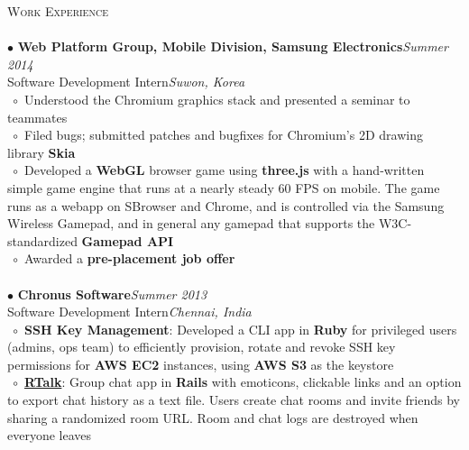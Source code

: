 \documentclass[a4paper,9pt]{article}
\begin{document}
\textcolor{myrust}{\large{\textsc{Work Experience}}}\textcolor{mygray}{\sout{\hfill}}\\\\
\normalsize
$\bullet$ \textbf{Web Platform Group, Mobile Division, Samsung Electronics}\hfill \textit{Summer 2014}\\
\textcolor{mydarkgray}{Software Development Intern}\hfill\textit{Suwon, Korea}\\
$\;\circ$ Understood the Chromium graphics stack and presented a seminar to teammates\\
$\;\circ$ Filed bugs; submitted patches and bugfixes for Chromium's 2D drawing library \textbf{Skia}\\
$\;\circ$ Developed a \textbf{WebGL} browser game using \textbf{three.js} with a hand-written simple game engine that runs at a nearly steady 60 FPS on mobile. The game runs as a webapp on SBrowser and Chrome, and is controlled via the Samsung Wireless Gamepad, and in general any gamepad that supports the W3C-standardized \textbf{Gamepad API}\\
$\;\circ$ Awarded a \textbf{pre-placement job offer}\\\\
$\bullet$ \textbf{Chronus Software}\hfill \textit{Summer 2013}\\
\textcolor{mydarkgray}{Software Development Intern}\hfill\textit{Chennai, India}\\
$\;\circ$ \textbf{SSH Key Management}: Developed a CLI app in \textbf{Ruby} for privileged users (admins, ops team) to efficiently provision, rotate and revoke SSH key permissions for \textbf{AWS EC2} instances, using \textbf{AWS S3} as the keystore\\
$\;\circ$ \href{https://github.com/wenderen/rtalk}{\textbf{RTalk}}: Group chat app in \textbf{Rails} with emoticons, clickable links and an option to export chat history as a text file. Users create chat rooms and invite friends by sharing a randomized room URL. Room and chat logs are destroyed when everyone leaves\\
\end{document}
